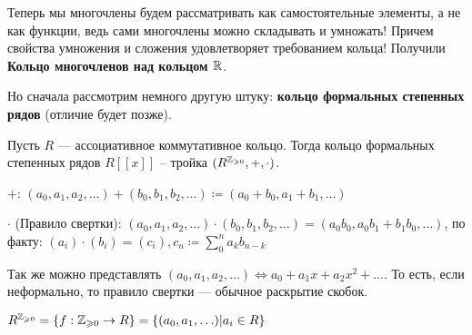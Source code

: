 Теперь мы многочлены будем рассматривать как самостоятельные элементы, а не как функции, ведь сами многочлены можно складывать и умножать! Причем свойства умножения и сложения удовлетворяет требованием кольца! Получили \textbf{Кольцо многочленов над кольцом $\mathbb{R}$}.

Но сначала рассмотрим немного другую штуку: \textbf{кольцо формальных степенных рядов} (отличие будет позже).
\begin{definition}
	Пусть $R$ --- ассоциативное коммутативное кольцо. Тогда кольцо формальных степенных рядов  $R[[x]]$ -- тройка  $(R^{\mathbb{Z}_{\geqslant 0}}, +, \cdot)$.

    $+$: $(a_0, a_1, a_2, \ldots) +  (b_0, b_1, b_2, \ldots) \coloneqq (a_0 + b_0, a_1 + b_1, \ldots)$

    $\cdot$ (Правило свертки):  $(a_0, a_1, a_2,\ldots) \cdot (b_0, b_1,b_2,\ldots) = (a_0 b_0, a_0b_1+b_1b_0,\ldots)$, по факту: $(a_i)\cdot(b_i) = (c_i), c_n \coloneqq  \sum_0^n a_kb_{n-k}$

    Так же можно представлять $(a_0, a_1, a_2,\ldots) \iff a_0 + a_1x + a_2x^2+\ldots$. То есть, если неформально, то правило свертки --- обычное раскрытие скобок.
\end{definition}
\begin{definition}
    $R^{\mathbb{Z}_{\geqslant 0}} = \{ f: \mathbb{Z}_{\geqslant 0} \to R\} = \{(a_0, a_1, \ldots) | a_i \in R\}$
\end{definition}

